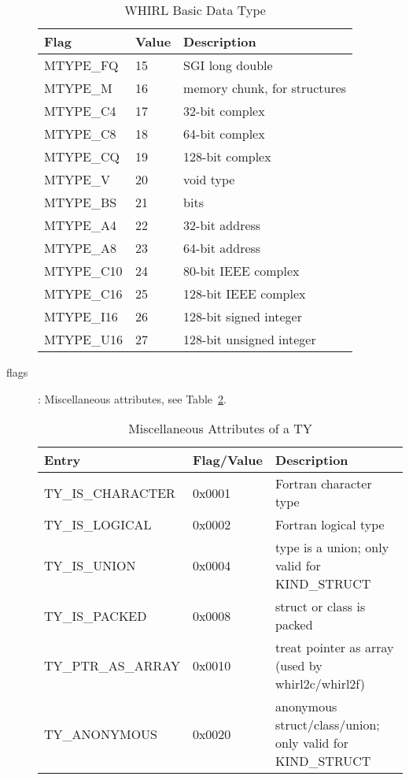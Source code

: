 \begin{description}
\begin{table}[h]
\centering
\caption{WHIRL Basic Data Type} 
\label{table17}
\begin{tabular}{|l|l|l|}\hline
Flag & Value & Description\\\hline\hline
\index{MTYPE\_FQ}%
MTYPE\_FQ & 15 & SGI long double\\\hline
\index{MTYPE\_M}%
MTYPE\_M & 16 & memory chunk, for structures \\\hline
\index{MTYPE\_C4}%
MTYPE\_C4 & 17 & 32-bit complex \\\hline
\index{MTYPE\_C8}%
MTYPE\_C8 & 18 & 64-bit complex \\\hline
\index{MTYPE\_CQ}%
MTYPE\_CQ & 19 & 128-bit complex\\\hline 
\index{MTYPE\_V}%
MTYPE\_V & 20 & void type \\\hline
\index{MTYPE\_BS}%
MTYPE\_BS & 21 & bits \\\hline
\index{MTYPE\_A4}%
MTYPE\_A4 & 22 & 32-bit address \\\hline
\index{MTYPE\_A8}%
MTYPE\_A8 & 23 & 64-bit address \\\hline
\index{MTYPE\_C10}%
MTYPE\_C10 & 24 & 80-bit IEEE complex \\\hline
\index{MTYPE\_C16}%
MTYPE\_C16 & 25 & 128-bit IEEE complex\\\hline 
\index{MTYPE\_I16}%
MTYPE\_I16 & 26 & 128-bit signed integer \\\hline
\index{MTYPE\_U16}%
MTYPE\_U16 & 27 & 128-bit unsigned integer\\\hline
\end{tabular}
\end{table} 

\item[flags]: Miscellaneous attributes, see Table~\ref{table18}. 


\begin{table}[h]
\centering
\caption{Miscellaneous Attributes of a TY} 
\label{table18}
\begin{tabular}{|l|l|l|}\hline
Entry & Flag/Value & Description \\\hline\hline
\index{TY\_IS\_CHARACTER}%
TY\_IS\_CHARACTER & 0x0001 & Fortran character type\\\hline
\index{TY\_IS\_LOGICAL}%
TY\_IS\_LOGICAL & 0x0002 & Fortran logical type\\\hline
\index{TY\_IS\_UNION}%
TY\_IS\_UNION & 0x0004 & type is a union; only valid for KIND\_STRUCT\\\hline
\index{TY\_IS\_PACKED}%
TY\_IS\_PACKED & 0x0008 & struct or class is packed\\\hline
\index{TY\_PTR\_AS\_ARRAY}%
TY\_PTR\_AS\_ARRAY & 0x0010 & treat pointer as array 
(used by whirl2c/whirl2f)\\\hline 
\index{TY\_ANONYMOUS}%
 TY\_ANONYMOUS & 0x0020 & anonymous struct/class/union; only valid for
 KIND\_STRUCT\\\hline


\end{tabular}
\end{table}
\end{description}
